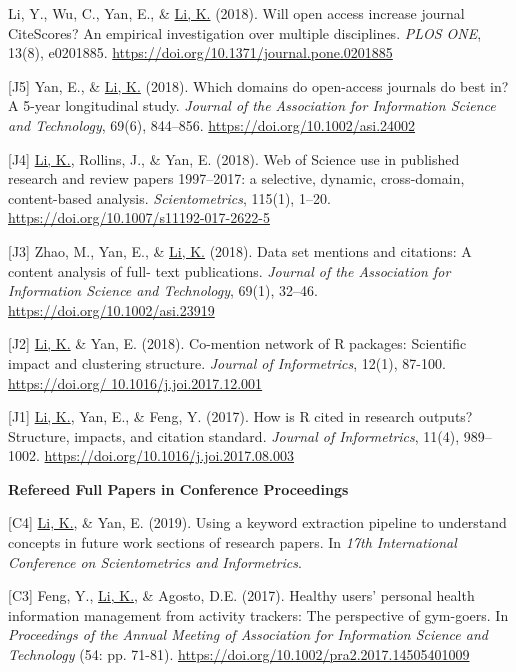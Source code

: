 \documentclass[margin, 10pt]{res} %
\begin{document}
\begin{resume}
[J6] Li, Y., Wu, C., Yan, E., \& \underline{Li, K.} (2018). Will open access increase journal CiteScores? An empirical investigation over multiple disciplines. \textit{PLOS ONE}, 13(8), e0201885. \href{https://doi.org/10.1371/journal.pone.0201885}{https://doi.org/10.1371/journal.pone.0201885}

[J5] Yan, E., \& \underline{Li, K.} (2018). Which domains do open-access journals do best in? A 5-year longitudinal study. \textit{Journal of the Association for Information Science and Technology}, 69(6), 844–856. \href{https://doi.org/10.1002/asi.24002}{https://doi.org/10.1002/asi.24002}

[J4] \underline{Li, K.}, Rollins, J., \& Yan, E. (2018). Web of Science use in published research and review papers 1997–2017: a selective, dynamic, cross-domain, content-based analysis. \textit{Scientometrics}, 115(1), 1–20. \href{https://doi.org/10.1007/s11192-017-2622-5}{https://doi.org/10.1007/s11192-017-2622-5}

[J3] Zhao, M., Yan, E., \& \underline{Li, K.} (2018). Data set mentions and citations: A content analysis of full- text publications. \textit{Journal of the Association for Information Science and Technology}, 69(1), 32–46. \href{https://doi.org/10.1002/asi.23919}{https://doi.org/10.1002/asi.23919}

[J2] \underline{Li, K.} \& Yan, E. (2018). Co-mention network of R packages: Scientific impact and clustering structure. \textit{Journal of Informetrics}, 12(1), 87-100. \href{https://doi.org/10.1016/j.joi.2017.12.001}{https://doi.org/ 10.1016/j.joi.2017.12.001}

[J1] \underline{Li, K.}, Yan, E., \& Feng, Y. (2017). How is R cited in research outputs? Structure, impacts, and citation standard. \textit{Journal of Informetrics}, 11(4), 989–1002. \href{https://doi.org/10.1016/j.joi.2017.08.003}{https://doi.org/10.1016/j.joi.2017.08.003}

\textbf{Refereed Full Papers in Conference Proceedings}

[C4] \underline{Li, K.}, \& Yan, E. (2019). Using a keyword extraction pipeline to understand concepts in future work sections of research papers. In \textit{17th International Conference on Scientometrics and Informetrics}.

[C3] Feng, Y., \underline{Li, K.}, \& Agosto, D.E. (2017). Healthy users’ personal health information management from activity trackers: The perspective of gym-goers. In \textit{Proceedings of the Annual Meeting of Association for Information Science and Technology} (54: pp. 71-81). \href{https://doi.org/10.1002/pra2.2017.14505401009}{https://doi.org/10.1002/pra2.2017.14505401009}


\end{resume}
\end{document}
